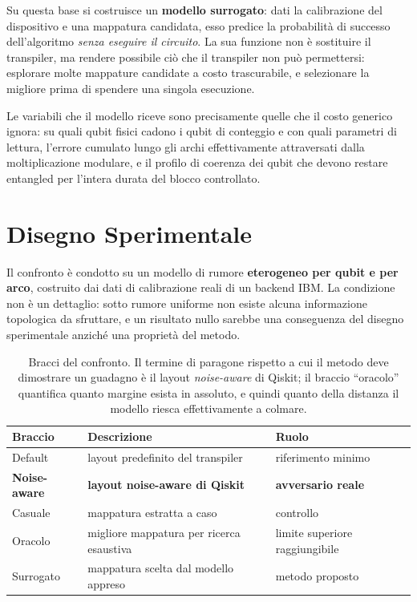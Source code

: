 \begin{onehalfspace}
Su questa base si costruisce un \textbf{modello surrogato}: dati la calibrazione del dispositivo e una mappatura candidata, esso predice la probabilità di successo dell'algoritmo \emph{senza eseguire il circuito}. La sua funzione non è sostituire il transpiler, ma rendere possibile ciò che il transpiler non può permettersi: esplorare molte mappature candidate a costo trascurabile, e selezionare la migliore prima di spendere una singola esecuzione.

Le variabili che il modello riceve sono precisamente quelle che il costo generico ignora: su quali qubit fisici cadono i qubit di conteggio e con quali parametri di lettura, l'errore cumulato lungo gli archi effettivamente attraversati dalla moltiplicazione modulare, e il profilo di coerenza dei qubit che devono restare entangled per l'intera durata del blocco controllato.

\section{Disegno Sperimentale}
\label{sec:disegno_layout}

Il confronto è condotto su un modello di rumore \textbf{eterogeneo per qubit e per arco}, costruito dai dati di calibrazione reali di un backend IBM. La condizione non è un dettaglio: sotto rumore uniforme non esiste alcuna informazione topologica da sfruttare, e un risultato nullo sarebbe una conseguenza del disegno sperimentale anziché una proprietà del metodo.

\begin{table}[H]
\centering
\small
\begin{tabular}{lll}
\toprule
\textbf{Braccio} & \textbf{Descrizione} & \textbf{Ruolo} \\
\midrule
Default        & layout predefinito del transpiler        & riferimento minimo \\
\textbf{Noise-aware} & \textbf{layout noise-aware di Qiskit} & \textbf{avversario reale} \\
Casuale        & mappatura estratta a caso                & controllo \\
Oracolo        & migliore mappatura per ricerca esaustiva & limite superiore raggiungibile \\
Surrogato      & mappatura scelta dal modello appreso     & metodo proposto \\
\bottomrule
\end{tabular}
\caption[Bracci di confronto per la compilazione appresa]{Bracci del confronto. Il termine di paragone rispetto a cui il metodo deve dimostrare un guadagno è il layout \textit{noise-aware} di Qiskit; il braccio ``oracolo'' quantifica quanto margine esista in assoluto, e quindi quanto della distanza il modello riesca effettivamente a colmare.}
\label{tab:bracci_layout}
\end{table}


\end{onehalfspace}
